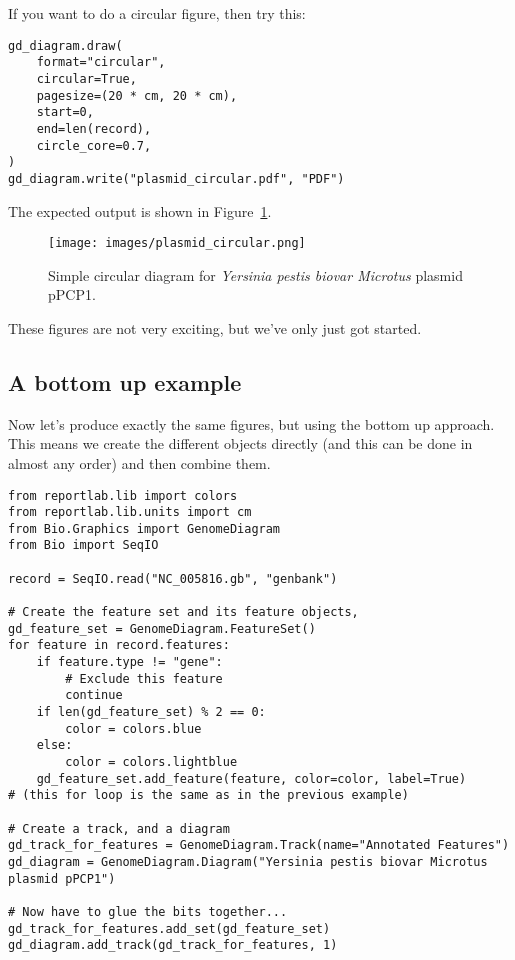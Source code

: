 If you want to do a circular figure, then try this:

\begin{verbatim}
gd_diagram.draw(
    format="circular",
    circular=True,
    pagesize=(20 * cm, 20 * cm),
    start=0,
    end=len(record),
    circle_core=0.7,
)
gd_diagram.write("plasmid_circular.pdf", "PDF")
\end{verbatim}

The expected output is shown in Figure~\ref{fig:plasmid_circular}.
\begin{figure}[htbp]
\centering
\texttt{[image: images/plasmid\_circular.png]}
\caption{Simple circular diagram for \textit{Yersinia pestis biovar Microtus} plasmid pPCP1.}
\label{fig:plasmid_circular}
\end{figure}
These figures are not very exciting, but we've only just got started.

\subsection{A bottom up example}
Now let's produce exactly the same figures, but using the bottom up approach.
This means we create the different objects directly (and this can be done in
almost any order) and then combine them.

\begin{verbatim}
from reportlab.lib import colors
from reportlab.lib.units import cm
from Bio.Graphics import GenomeDiagram
from Bio import SeqIO

record = SeqIO.read("NC_005816.gb", "genbank")

# Create the feature set and its feature objects,
gd_feature_set = GenomeDiagram.FeatureSet()
for feature in record.features:
    if feature.type != "gene":
        # Exclude this feature
        continue
    if len(gd_feature_set) % 2 == 0:
        color = colors.blue
    else:
        color = colors.lightblue
    gd_feature_set.add_feature(feature, color=color, label=True)
# (this for loop is the same as in the previous example)

# Create a track, and a diagram
gd_track_for_features = GenomeDiagram.Track(name="Annotated Features")
gd_diagram = GenomeDiagram.Diagram("Yersinia pestis biovar Microtus plasmid pPCP1")

# Now have to glue the bits together...
gd_track_for_features.add_set(gd_feature_set)
gd_diagram.add_track(gd_track_for_features, 1)
\end{verbatim}

